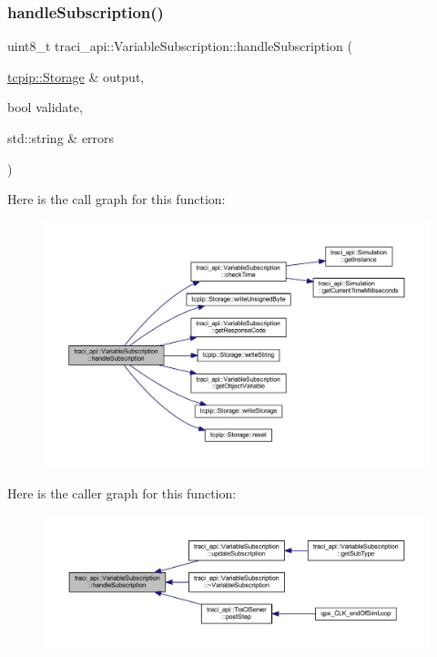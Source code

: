 \subsubsection{\texorpdfstring{handle\+Subscription()}{handleSubscription()}}
{\footnotesize\ttfamily uint8\+\_\+t traci\+\_\+api\+::\+Variable\+Subscription\+::handle\+Subscription (\begin{DoxyParamCaption}\item[{\hyperlink{classtcpip_1_1_storage}{tcpip\+::\+Storage} \&}]{output,  }\item[{bool}]{validate,  }\item[{std\+::string \&}]{errors }\end{DoxyParamCaption})}

Here is the call graph for this function\+:\nopagebreak
\begin{figure}[H]
\begin{center}
\leavevmode
\includegraphics[width=350pt]{classtraci__api_1_1_variable_subscription_ab75320e8ec7d1406ea47a703fb09de63_cgraph}
\end{center}
\end{figure}
Here is the caller graph for this function\+:\nopagebreak
\begin{figure}[H]
\begin{center}
\leavevmode
\includegraphics[width=350pt]{classtraci__api_1_1_variable_subscription_ab75320e8ec7d1406ea47a703fb09de63_icgraph}
\end{center}
\end{figure}
\mbox{\label{classtraci__api_1_1_variable_subscription_a4a56033c7b432c2e2d029ca5fd5c3468}} 
